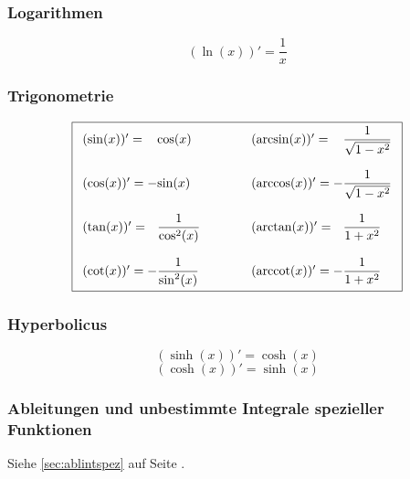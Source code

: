 \subsubsection{Logarithmen}
\[ \boxed{ (\ln(x))' = \frac{1}{x} } \]  

\subsubsection{Trigonometrie}

\[ \boxed{ \begin{array}{ l @{}l @{\quad\quad\quad}l @{}l }
(\sin(x))' =   &\cos(x)             & \quad (\arcsin(x))' =   & \dfrac{1}{\sqrt{1 - x^2}} \\\\
(\cos(x))' = - &\sin(x)             & \quad (\arccos(x))' = - & \dfrac{1}{\sqrt{1 - x^2}} \\\\
(\tan(x))' =   &\dfrac{1}{\cos^2(x)} & \quad (\arctan(x))' =   & \dfrac{1}{1 + x^2} \\\\
(\cot(x))' = - &\dfrac{1}{\sin^2(x)} & \quad (\arccot(x))' = - & \dfrac{1}{1 + x^2} 
\end{array}} \]

\subsubsection{Hyperbolicus}
\[ \boxed{(\sinh(x))' = \cosh(x)} \]
\[ \boxed{(\cosh(x))' = \sinh(x)} \]

\subsubsection{Ableitungen und unbestimmte Integrale spezieller Funktionen}
Siehe \ref{sec:ablintspez} auf Seite \pageref{sec:ablintspez}. 